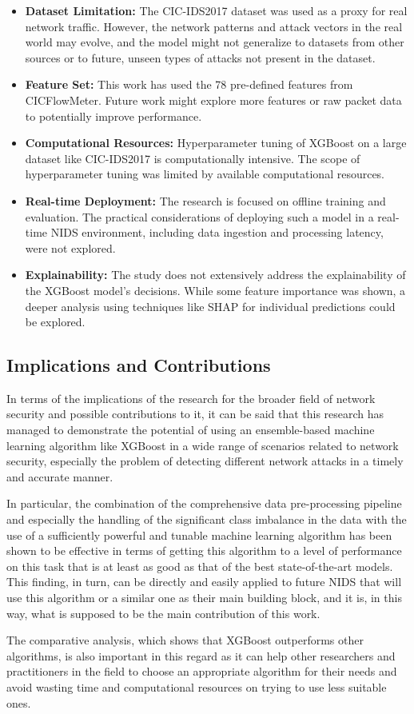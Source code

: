 \begin{itemize} 
\item \textbf{Dataset Limitation: } The CIC-IDS2017 dataset was used as a proxy for real network traffic. However, the network patterns and attack vectors in the real world may evolve, and the model might not generalize to datasets from other sources or to future, unseen types of attacks not present in the dataset.
\item \textbf{Feature Set: } This work has used the 78 pre-defined features from CICFlowMeter. Future work might explore more features or raw packet data to potentially improve performance.
\item \textbf{Computational Resources: } Hyperparameter tuning of XGBoost on a large dataset like CIC-IDS2017 is computationally intensive. The scope of hyperparameter tuning was limited by available computational resources.
\item \textbf{Real-time Deployment: } The research is focused on offline training and evaluation. The practical considerations of deploying such a model in a real-time NIDS environment, including data ingestion and processing latency, were not explored.
\item \textbf{Explainability: } The study does not extensively address the explainability of the XGBoost model's decisions. While some feature importance was shown, a deeper analysis using techniques like SHAP for individual predictions could be explored.
\end{itemize} 

\subsection{Implications and Contributions} 

In terms of the implications of the research for the broader field of network security and possible contributions to it, it can be said that this research has managed to demonstrate the potential of using an ensemble-based machine learning algorithm like XGBoost in a wide range of scenarios related to network security, especially the problem of detecting different network attacks in a timely and accurate manner.

In particular, the combination of the comprehensive data pre-processing pipeline and especially the handling of the significant class imbalance in the data with the use of a sufficiently powerful and tunable machine learning algorithm has been shown to be effective in terms of getting this algorithm to a level of performance on this task that is at least as good as that of the best state-of-the-art models. This finding, in turn, can be directly and easily applied to future NIDS that will use this algorithm or a similar one as their main building block, and it is, in this way, what is supposed to be the main contribution of this work.

The comparative analysis, which shows that XGBoost outperforms other algorithms, is also important in this regard as it can help other researchers and practitioners in the field to choose an appropriate algorithm for their needs and avoid wasting time and computational resources on trying to use less suitable ones.

